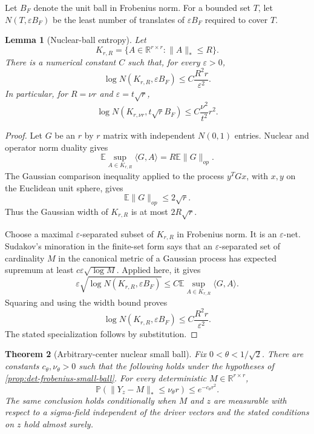 \documentclass[11pt]{article}
\numberwithin{equation}{section}
\newtheorem{theorem}{Theorem}[section]
\newtheorem{lemma}[theorem]{Lemma}
\theoremstyle{definition}
\theoremstyle{remark}
\newcommand{\R}{\mathbb R}
\newcommand{\E}{\mathbb E}
\newcommand{\Pp}{\mathbb P}
\newcommand{\1}{\boldsymbol 1}
\begin{document}
\begin{aiblock}
Let $B_F$ denote the unit ball in Frobenius norm. For a
bounded set $T$, let $N(T,\varepsilon B_F)$ be the least
number of translates of $\varepsilon B_F$ required to
cover $T$.

\begin{lemma}[Nuclear-ball entropy]\label{lem:det-nuclear-cover}
  Let
  \[
    K_{r,R}=\{A\in\R^{r\times r}:\|A\|_*\le R\}.
  \]
  There is a numerical constant $C$ such that, for every
  $\varepsilon>0$,
  \[
    \log N(K_{r,R},\varepsilon B_F) \le
    C\frac{R^2r}{\varepsilon^2}.
  \]
  In particular, for $R=\nu r$ and
  $\varepsilon=t\sqrt r$,
  \[
    \log N(K_{r,\nu r},t\sqrt r B_F) \le C\frac{\nu^2}{t^2}r^2.
  \]
\end{lemma}

\begin{proof}
  Let $G$ be an $r$ by $r$ matrix with independent
  $N(0,1)$ entries. Nuclear and operator norm duality
  gives
  \[
    \E\sup_{A\in K_{r,R}}\langle G,A\rangle
    =R\E\|G\|_{op}.
  \]
  The Gaussian comparison inequality applied to the
  process $y^TGx$, with $x,y$ on the Euclidean unit
  sphere, gives
  \[
    \E\|G\|_{op}\le2\sqrt r.
  \]
  Thus the Gaussian width of $K_{r,R}$ is at most
  $2R\sqrt r$.

  Choose a maximal $\varepsilon$-separated subset of
  $K_{r,R}$ in Frobenius norm. It is an
  $\varepsilon$-net. Sudakov's minoration in the
  finite-set form \cite[Section 2.1]{Fernique1974} says
  that an $\varepsilon$-separated set of cardinality $M$
  in the canonical metric of a Gaussian process has
  expected supremum at least
  $c\varepsilon\sqrt{\log M}$. Applied here, it gives
  \[
    \varepsilon\sqrt{\log N(K_{r,R},\varepsilon B_F)}
    \le C\E\sup_{A\in K_{r,R}}\langle G,A\rangle.
  \]
  Squaring and using the width bound proves
  \[
    \log N(K_{r,R},\varepsilon B_F) \le
    C\frac{R^2r}{\varepsilon^2}.
  \]
  The stated specialization follows by substitution.
\end{proof}

\begin{theorem}[Arbitrary-center nuclear small ball]
  \label{thm:det-nuclear-small-ball}
  Fix $0<\theta<1/\sqrt2$. There are constants
  $c_\theta,\nu_\theta>0$ such that the following holds
  under the hypotheses of
  \cref{prop:det-frobenius-small-ball}. For every
  deterministic $M\in\R^{r\times r}$,
  \[
    \Pp(\|Y_z-M\|_*\le\nu_\theta r) \le e^{-c_\theta r^2}.
  \]
  The same conclusion holds conditionally when $M$ and $z$
  are measurable with respect to a sigma-field independent
  of the driver vectors and the stated conditions on $z$
  hold almost surely.
\end{theorem}


\end{aiblock}
\end{document}
